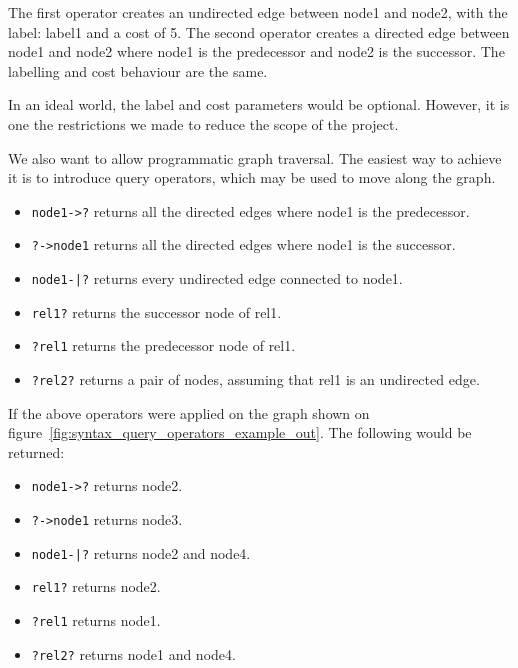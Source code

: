 The first operator creates an undirected edge between node1 and node2, with the label: label1 and a cost of 5.
The second operator creates a directed edge between node1 and node2 where node1 is the predecessor and node2 is the successor.
The labelling and cost behaviour are the same.

In an ideal world, the label and cost parameters would be optional.
However, it is one the restrictions we made to reduce the scope of the project.

We also want to allow programmatic graph traversal.
The easiest way to achieve it is to introduce query operators, which may be used to move along the graph.

\begin{itemize}
    \item \lstinline{node1->?} returns all the directed edges where node1 is the predecessor.
    \item \lstinline{?->node1} returns all the directed edges where node1 is the successor.
    \item \lstinline{node1-|?} returns every undirected edge connected to node1.
    \item \lstinline{rel1?} returns the successor node of rel1.
    \item \lstinline{?rel1} returns the predecessor node of rel1.
    \item \lstinline{?rel2?} returns a pair of nodes, assuming that rel1 is an undirected edge.
\end{itemize}

If the above operators were applied on the graph shown on figure~\ref{fig:syntax_query_operators_example_out}.
The following would be returned:

\begin{itemize}
    \item \lstinline{node1->?} returns node2.
    \item \lstinline{?->node1} returns node3.
    \item \lstinline{node1-|?} returns node2 and node4.
    \item \lstinline{rel1?} returns node2.
    \item \lstinline{?rel1} returns node1.
    \item \lstinline{?rel2?} returns node1 and node4.
\end{itemize}


